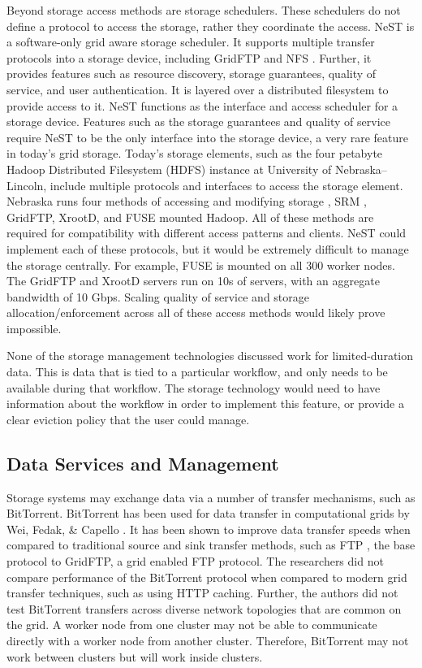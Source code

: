 Beyond storage access methods are storage schedulers.  These schedulers do not define a protocol to access the storage, rather they coordinate the access.  NeST \cite{bent2002flexibility} is a software-only grid aware storage scheduler.  It supports multiple transfer protocols into a storage device, including GridFTP \cite{allcock2005globus} and NFS \cite{walsh1985overview}.  Further, it provides features such as resource discovery, storage guarantees, quality of service, and user authentication.  It is layered over a distributed filesystem to provide access to it.  NeST functions as the interface and access scheduler for a storage device.  Features such as the storage guarantees and quality of service require NeST to be the only interface into the storage device, a very rare feature in today's grid storage.  Today's storage elements, such as the four petabyte Hadoop Distributed Filesystem (HDFS) instance at University of Nebraska--Lincoln, include multiple protocols and interfaces to access the storage element.  Nebraska runs four methods of accessing and modifying storage \cite{attebury2009hadoop}, SRM \cite{shoshani2002storage}, GridFTP, XrootD, and FUSE \cite{szeredi2010fuse} mounted Hadoop.  All of these methods are required for compatibility with different access patterns and clients.  NeST could implement each of these protocols, but it would be extremely difficult to manage the storage centrally.  For example, FUSE is mounted on all 300 worker nodes.  The GridFTP and XrootD servers run on 10s of servers, with an aggregate bandwidth of 10 Gbps.  Scaling quality of service and storage allocation/enforcement across all of these access methods would likely prove impossible.

None of the storage management technologies discussed work for limited-duration data.  This is data that is tied to a particular workflow, and only needs to be available during that workflow.  The storage technology would need to have information about the workflow in order to implement this feature, or provide a clear eviction policy that the user could manage.

\subsection{Data Services and Management}

Storage systems may exchange data via a number of transfer mechanisms, such as BitTorrent.  BitTorrent has been used for data transfer in computational grids by Wei, Fedak, \& Capello \cite{wei2005collaborative, wei2005scheduling, wei2007towards}.  It has been shown to improve data transfer speeds when compared to traditional source and sink transfer methods, such as FTP \cite{postel1985file}, the base protocol to GridFTP, a grid enabled FTP protocol.  The researchers did not compare performance of the BitTorrent protocol when compared to modern grid transfer techniques, such as using HTTP caching.  Further, the authors did not test BitTorrent transfers across diverse network topologies that are common on the grid.  A worker node from one cluster may not be able to communicate directly with a worker node from another cluster.  Therefore, BitTorrent may not work between clusters but will work inside clusters.

